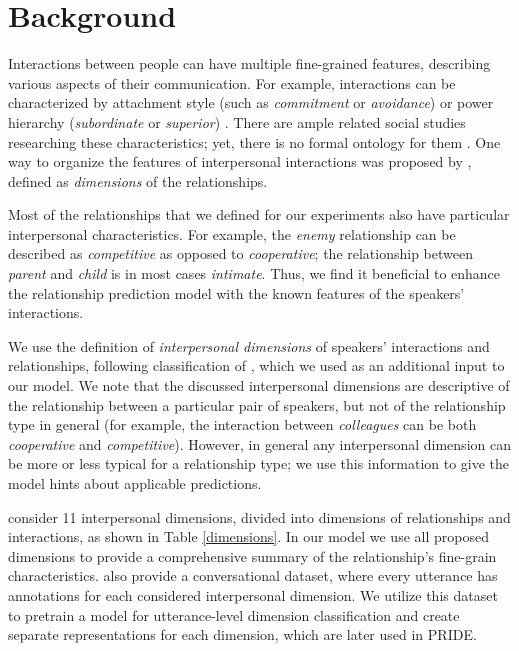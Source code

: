 
\section{Background}
\label{background}

Interactions between people can have multiple fine-grained features, describing various aspects of their communication. For example, interactions can be characterized by attachment style (such as \textit{commitment} or \textit{avoidance}) \cite{qamar2021relationship} or power hierarchy (\textit{subordinate} or \textit{superior}) \cite{prabhakaran2014predicting}. There are ample related social studies researching these characteristics; yet, there is no formal ontology for them \cite{rashid2018characterizing}. One way to organize the features of interpersonal interactions was proposed by \cite{rashid2017dimensions}, defined as \textit{dimensions} of the relationships.

Most of the relationships that we defined for our experiments also have particular interpersonal characteristics. For example, the \textit{enemy} relationship can be described as \textit{competitive} as opposed to \textit{cooperative}; the relationship between \textit{parent} and \textit{child} is in most cases \textit{intimate}. Thus, we find it beneficial to enhance the relationship prediction model with the known features of the speakers' interactions. 

We use the definition of \textit{interpersonal dimensions} \cite{wish1976perceived} of speakers' interactions and relationships, following classification of \citet{rashid2018characterizing}, which we used as an additional input to our model. We note that the discussed interpersonal dimensions are descriptive of the relationship between a particular pair of speakers, but not of the relationship type in general (for example, the interaction between \textit{colleagues} can be both \textit{cooperative} and \textit{competitive}). However, in general any interpersonal dimension can be more or less typical for a relationship type; we use this information to give the model hints about applicable predictions.

\citet{rashid2018characterizing} consider 11 interpersonal dimensions, divided into dimensions of relationships and interactions, as shown in Table \ref{dimensions}. In our model we use all proposed dimensions to provide a comprehensive summary of the relationship's fine-grain characteristics. %
\citet{rashid2018characterizing} also provide a conversational dataset, where every utterance has annotations for each considered interpersonal dimension. We utilize this dataset to pretrain a model for utterance-level dimension classification and create separate representations for each dimension, which are later used in PRIDE.


